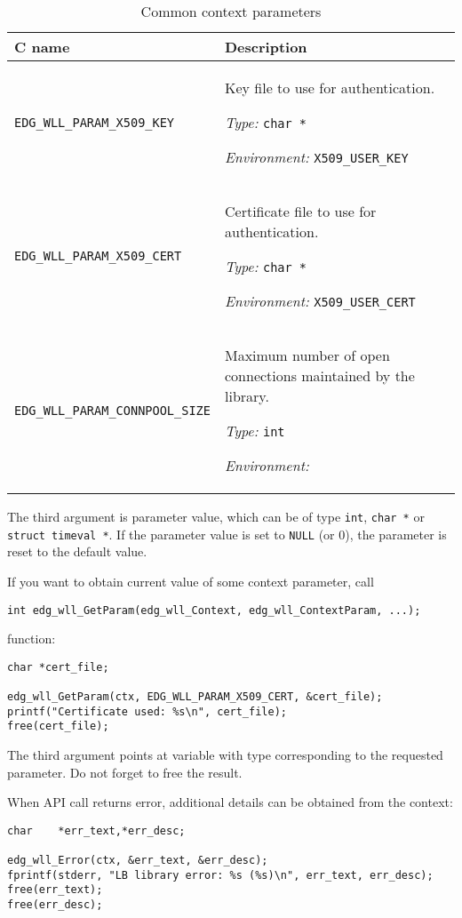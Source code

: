 \begin{table}[h]
\begin{tabularx}{\textwidth}{lX}
{\bf C name} & {\bf Description} \\
\hline
\lstinline'EDG_WLL_PARAM_X509_KEY' &
Key file to use for authentication.
\par {\it Type: } \lstinline'char *'
\par {\it Environment: } \lstinline'X509_USER_KEY'
\\
\lstinline'EDG_WLL_PARAM_X509_CERT' &
Certificate file to use for authentication.
\par {\it Type: } \lstinline'char *'
\par {\it Environment: } \lstinline'X509_USER_CERT'
\\
\lstinline'EDG_WLL_PARAM_CONNPOOL_SIZE' &
Maximum number of open connections maintained by the library.
\par {\it Type: } \lstinline'int'
\par {\it Environment: } \\
\end{tabularx}
\caption{Common context parameters}
\label{t:cparam}
\end{table}

The third argument is parameter value, which can be of type
\verb'int', \verb'char *' or \verb'struct timeval *'.
If the parameter value is set to \verb'NULL' (or 0), the
parameter is reset to the default value.

If you want to obtain current value of some context parameter, call
\begin{lstlisting}
int edg_wll_GetParam(edg_wll_Context, edg_wll_ContextParam, ...);
\end{lstlisting}
function:
\begin{lstlisting}
char *cert_file;

edg_wll_GetParam(ctx, EDG_WLL_PARAM_X509_CERT, &cert_file);
printf("Certificate used: %s\n", cert_file);
free(cert_file);
\end{lstlisting}
The third argument points at variable with type corresponding to the
requested parameter. Do not forget to free the result.


%
When \LB API call returns error, additional details can be obtained
from the context:
\begin{lstlisting}
char    *err_text,*err_desc;

edg_wll_Error(ctx, &err_text, &err_desc);
fprintf(stderr, "LB library error: %s (%s)\n", err_text, err_desc);
free(err_text);
free(err_desc);
\end{lstlisting}


